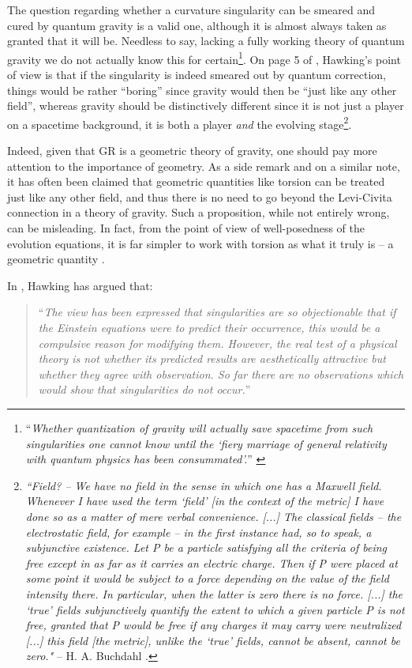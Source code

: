 \documentclass[12pt]{article}
\newcommand{\2}{$^2$}
\newcommand{\3}{$^3$}
\newcommand{\4}{$_4$}
\newcommand{\5}{$_5$}
\begin{document}
The question regarding whether a curvature singularity can be smeared and cured by quantum gravity is a valid one, although it is almost always taken as granted that it will be. Needless to say, lacking a fully working theory of quantum gravity we do not actually know this for certain\footnote{``\emph{Whether quantization of gravity will actually save spacetime from such singularities one cannot know until the `fiery marriage of general relativity with quantum physics has been consummated'.}'' \cite{MTW}}. 
On page 5 of \cite{HP}, Hawking's point of view is that if the singularity is indeed smeared out by quantum correction, things would be rather ``boring'' since gravity would then be ``just like any other field'', whereas gravity should be distinctively different since it is not just a player on a spacetime background, it is both a player \emph{and} the evolving stage\footnote{\emph{``Field? -- We have no field in the sense in which one has a Maxwell field. Whenever I have used the term `field' [in the context of the metric] I have done so as a matter of mere verbal convenience. [...] The classical fields -- the electrostatic field, for example -- in the first instance had, so to speak, a subjunctive existence. Let P be a particle satisfying all the criteria of being free except in as far as it carries an electric charge. Then if P were placed at some point it would be subject to a force depending on the value of the field intensity there. In particular, when the latter is zero there is no force. [...] the `true' fields subjunctively quantify the extent to which a given particle P is not free, granted that P would be free if any charges it may carry were neutralized [...] this field [the metric], unlike the `true' fields, cannot be absent, cannot be zero."} -- H. A. Buchdahl \cite{Buchdahl}.}. 

Indeed, given that GR is a geometric theory of gravity, one should pay more attention to the importance of geometry.  As a side remark and on a similar note, it has often been claimed that geometric quantities like torsion can be treated just like any other field, and thus there is no need to go beyond the Levi-Civita connection in a theory of gravity. Such a proposition, while not entirely wrong, can be misleading. In fact, from the point of view of well-posedness of the evolution equations, it is far simpler to work with torsion as what it truly is -- a geometric quantity \cite{nester}. 

In \cite{Hawking1966}, Hawking has argued that:
\begin{quote}
``\emph{The view has been expressed that singularities are so objectionable that if the Einstein equations were to predict their occurrence, this would be a compulsive reason for modifying them. However, the real test of a physical theory is not whether its predicted results are aesthetically attractive but whether they agree with observation. So far there are no observations which would show that singularities do not occur.}''
\end{quote}
\end{document}
